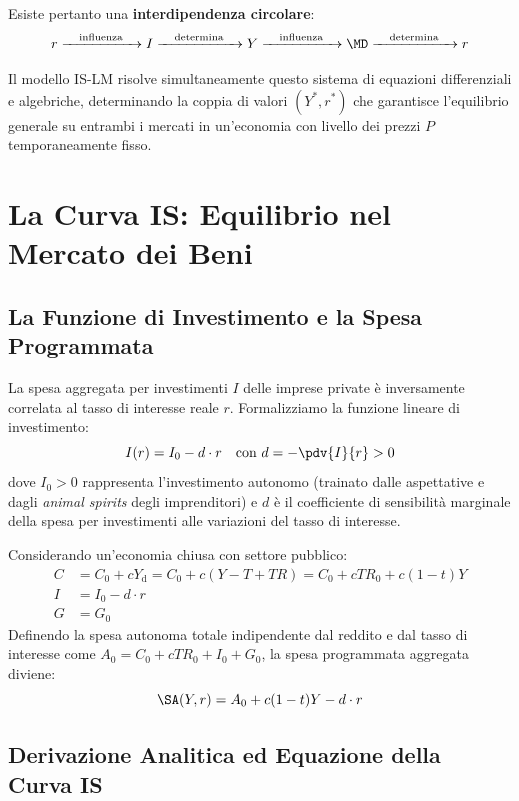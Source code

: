 Esiste pertanto una \textbf{interdipendenza circolare}:
\begin{equation}
    r \xrightarrow{\quad\text{influenza}\quad} I \xrightarrow{\quad\text{determina}\quad} Y \xrightarrow{\quad\text{influenza}\quad} \MD \xrightarrow{\quad\text{determina}\quad} r
\end{equation}

Il modello IS-LM risolve simultaneamente questo sistema di equazioni differenziali e algebriche, determinando la coppia di valori $(Y^*, r^*)$ che garantisce l'equilibrio generale su entrambi i mercati in un'economia con livello dei prezzi $P$ temporaneamente fisso.

\section{La Curva IS: Equilibrio nel Mercato dei Beni}

\subsection{La Funzione di Investimento e la Spesa Programmata}
La spesa aggregata per investimenti $I$ delle imprese private è inversamente correlata al tasso di interesse reale $r$. Formalizziamo la funzione lineare di investimento:
\begin{equation}
    I(r) = I_0 - d \cdot r \quad \text{con } d = -\pdv{I}{r} > 0
\end{equation}
dove $I_0 > 0$ rappresenta l'investimento autonomo (trainato dalle aspettative e dagli \textit{animal spirits} degli imprenditori) e $d$ è il coefficiente di sensibilità marginale della spesa per investimenti alle variazioni del tasso di interesse.

Considerando un'economia chiusa con settore pubblico:
\begin{align}
    C &= C_0 + c Y_{\mathrm{d}} = C_0 + c (Y - T + TR) = C_0 + c TR_0 + c(1-t)Y \\
    I &= I_0 - d \cdot r \\
    G &= G_0
\end{align}
Definendo la spesa autonoma totale indipendente dal reddito e dal tasso di interesse come $A_0 = C_0 + c TR_0 + I_0 + G_0$, la spesa programmata aggregata diviene:
\begin{equation}
    \SA(Y, r) = A_0 + c(1-t)Y - d \cdot r
\end{equation}

\subsection{Derivazione Analitica ed Equazione della Curva IS}

